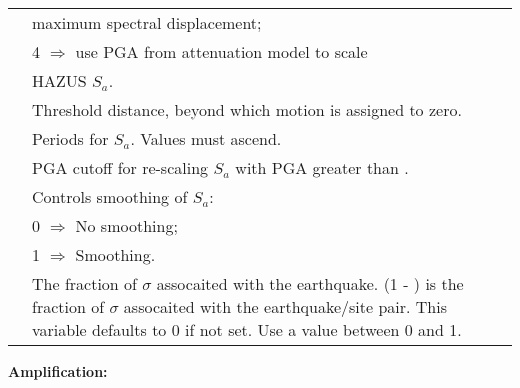 \documentclass[a4paper, 12pt]{report}
\begin{document}
\begin{supertabular}{lp{0.6\textwidth}}
 & \hspace{2.8em} maximum spectral displacement; \\
 & \hspace{0.5em} 4 $\Rightarrow$ use PGA from attenuation model to scale \\
 & \hspace{2.8em} HAZUS $S_a$. \\
  &  Threshold distance, beyond which motion is assigned to zero.       \\
 &  Periods for $S_a$. Values must ascend.    \\
   & PGA cutoff for re-scaling $S_a$ with PGA greater than .      \\
  & Controls smoothing of $S_a$: \\
 & \hspace{0.5em} 0 $\Rightarrow$ No smoothing; \\
 & \hspace{0.5em} 1 $\Rightarrow$ Smoothing.  \\
  &  The fraction of
 $\sigma$ assocaited with the earthquake. (1 -
 ) is the fraction of $\sigma$
 assocaited with the earthquake/site pair.  This variable defaults to
 0 if not set.  Use a value between 0 and 1.\\
 \end{supertabular}


\vspace{2em} \noindent \textbf{Amplification:}
\end{document}

